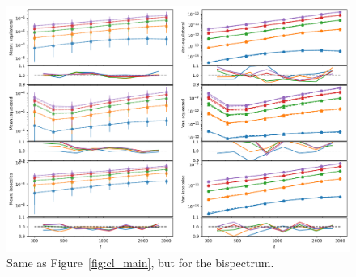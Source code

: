 \begin{figure}[p]
    \centering
    \includegraphics[width=\textwidth]{figures/results/bl_main.png}
    \caption[Bispectrum Mean and Variance]{Same as Figure~\ref{fig:cl_main}, but for the bispectrum. }
    \label{fig:bl_main}
\end{figure}

